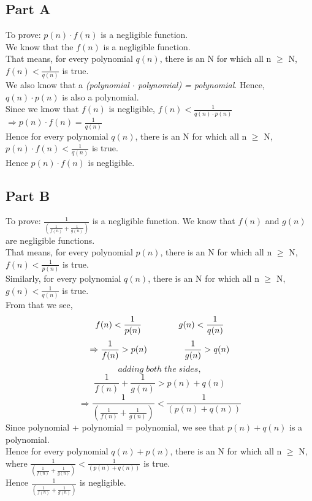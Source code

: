 \documentclass{article}
\begin{document}
        \subsection*{Part A}
            To prove: $p(n)\cdot f(n)$ is a negligible function.\\
            We know that the $f(n)$ is a negligible function.\\
            That means, for every polynomial $q(n)$, there is an N for which all n $\geq$ N, $f(n) < \frac{1}{q(n)}$ is true.\\
            We also know that a \textit{(polynomial $\cdot$ polynomial) = polynomial}. Hence, $q(n)\cdot p(n)$ is also a polynomial.\\
            Since we know that $f(n)$ is negligible, $f(n)<\frac{1}{q(n)\cdot p(n)}$\\
            $\Rightarrow p(n)\cdot f(n) = \frac{1}{q(n)}$\\
            Hence for every polynomial $q(n)$, there is an N for which all n $\geq$ N, $p(n)\cdot f(n) < \frac{1}{q(n)}$ is true.\\
            Hence $p(n)\cdot f(n)$ is negligible.

        \subsection*{Part B}
            To prove: $\frac{1}{(\frac{1}{f(n)} + \frac{1}{g(n)})}$ is a negligible function.
            We know that $f(n)$ and $g(n)$ are negligible functions.\\
            That means, for every polynomial $p(n)$, there is an N for which all n $\geq$ N, $f(n) < \frac{1}{p(n)}$ is true.\\
            Similarly, for every polynomial $q(n)$, there is an N for which all n $\geq$ N, $g(n) < \frac{1}{q(n)}$ is true.\\

            From that we see,
            $$f(n) < \frac{1}{p(n)} \hspace{10ex} g(n) < \frac{1}{q(n)}$$
            $$\Rightarrow \frac{1}{f(n)} > p(n) \hspace{10ex} \frac{1}{g(n)} > q(n)$$
            $$adding\; both\; the\; sides,$$
            $$\frac{1}{f(n)}+\frac{1}{g(n)} > p(n)+q(n)$$
            $$\Rightarrow \frac{1}{(\frac{1}{f(n)} + \frac{1}{g(n)})} < \frac{1}{(p(n)+q(n))}$$
            Since polynomial + polynomial = polynomial, we see that $p(n)+q(n)$ is a polynomial.\\
            Hence for every polynomial $q(n)+p(n)$, there is an N for which all n $\geq$ N, where $\frac{1}{(\frac{1}{f(n)} + \frac{1}{g(n)})} < \frac{1}{(p(n)+q(n))}$ is true.\\
            Hence $\frac{1}{(\frac{1}{f(n)} + \frac{1}{g(n)})}$ is negligible.
\end{document}

